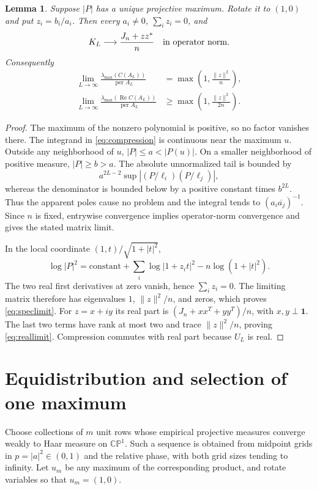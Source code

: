 \documentclass[11pt]{article}
\newtheorem{lemma}[theorem]{Lemma}
\DeclareMathOperator{\per}{per}
\DeclareMathOperator{\Ree}{Re}
\newcommand{\CP}{\mathbb{CP}}
\newcommand{\one}{\mathbf 1}
\begin{document}
\begin{lemma}\label{lem:limit}
Suppose $|P|$ has a unique projective maximum. Rotate it to $(1,0)$ and put
$z_i=b_i/a_i$. Then every $a_i\ne0$, $\sum_i z_i=0$, and
\[
 K_L\longrightarrow\frac{J_n+zz^*}{n}
 \quad\hbox{in operator norm}.
\]
Consequently
\begin{align}
 \lim_{L\to\infty}\frac{\lambda_{\max}(C(A_L))}{\per A_L}
 &=\max\left(1,\frac{\|z\|^2}{n}\right),\label{eq:speclimit}\\
 \lim_{L\to\infty}\frac{\lambda_{\max}(\Ree C(A_L))}{\per A_L}
 &\ge\max\left(1,\frac{\|z\|^2}{2n}\right).\label{eq:reallimit}
\end{align}
\end{lemma}
\begin{proof}
The maximum of the nonzero polynomial is positive, so no factor vanishes there.
The integrand in \eqref{eq:compression} is continuous near the maximum $u$.
Outside any neighborhood of $u$, $|P|\le a<|P(u)|$. On a smaller neighborhood
of positive measure, $|P|\ge b>a$. The absolute unnormalized tail is bounded by
\[
 a^{2L-2}\sup\left|(P/\ell_i)(P/\ell_j)\right|,
\]
whereas the denominator is bounded below by a positive constant times $b^{2L}$.
Thus the apparent poles cause no problem and the integral tends to
$(a_i\overline{a_j})^{-1}$. Since $n$ is fixed, entrywise convergence implies
operator-norm convergence and gives the stated matrix limit.

In the local coordinate $(1,t)/\sqrt{1+|t|^2}$,
\[
 \log|P|^2=\text{constant}+\sum_i\log|1+z_i t|^2
                    -n\log(1+|t|^2).
\]
The two real first derivatives at zero vanish, hence $\sum_i z_i=0$.
The limiting matrix therefore has eigenvalues $1$, $\|z\|^2/n$, and zeros,
which proves \eqref{eq:speclimit}. For $z=x+iy$ its real part is
$(J_n+xx^T+yy^T)/n$, with $x,y\perp\one$. The last two terms have rank at most
two and trace $\|z\|^2/n$, proving \eqref{eq:reallimit}. Compression commutes
with real part because $U_L$ is real.
\end{proof}

\section{Equidistribution and selection of one maximum}
Choose collections of $m$ unit rows whose empirical projective measures
converge weakly to Haar measure on $\CP^1$. Such a sequence is obtained from
midpoint grids in $p=|a|^2\in(0,1)$ and the relative phase, with both grid sizes
tending to infinity. Let $u_m$ be any maximum of the corresponding product,
and rotate variables so that $u_m=(1,0)$.
\end{document}
